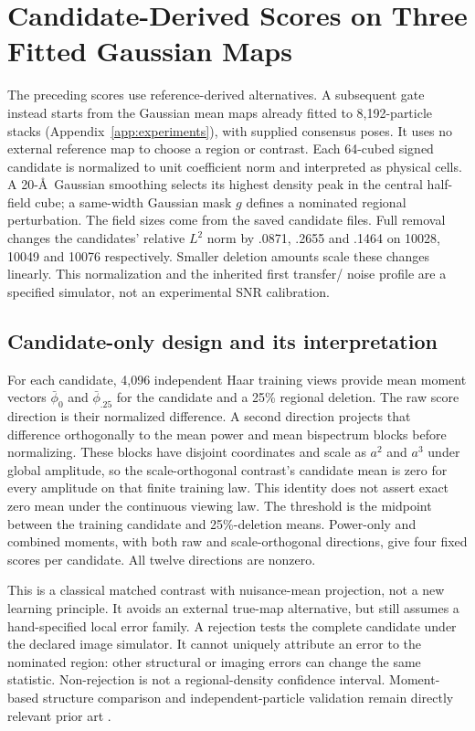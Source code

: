 \section{Candidate-Derived Scores on Three Fitted Gaussian Maps}
\label{app:candidatescore}
The preceding scores use reference-derived alternatives. A subsequent gate
instead starts from the Gaussian mean maps already fitted to 8,192-particle
stacks (Appendix~\ref{app:experiments}), with supplied consensus poses. It uses
no external reference map to choose a region or contrast. Each 64-cubed signed
candidate is normalized to unit coefficient norm and interpreted as physical
cells. A 20-\AA\ Gaussian smoothing selects its highest density peak in the
central half-field cube; a same-width Gaussian mask $g$ defines a nominated
regional perturbation. The field sizes come from the saved candidate files.
Full removal changes the candidates' relative $L^2$ norm by .0871, .2655 and
.1464 on 10028, 10049 and 10076 respectively. Smaller deletion amounts scale
these changes linearly. This normalization and the inherited first transfer/
noise profile are a specified simulator, not an experimental SNR calibration.

\subsection{Candidate-only design and its interpretation}
For each candidate, 4,096 independent Haar training views provide mean moment
vectors $\bar\phi_0$ and $\bar\phi_{.25}$ for the candidate and a 25\%
regional deletion. The raw score direction is their normalized difference.
A second direction projects that difference orthogonally to the mean power
and mean bispectrum blocks before normalizing. These blocks have disjoint
coordinates and scale as $a^2$ and $a^3$ under global amplitude, so the
scale-orthogonal contrast's candidate mean is zero for every amplitude on
that finite training law. This identity does not assert exact zero mean
under the continuous viewing law. The threshold is the midpoint between
the training candidate and 25\%-deletion means. Power-only and combined
moments, with both raw and scale-orthogonal directions, give four fixed
scores per candidate. All twelve directions are nonzero.

This is a classical matched contrast with nuisance-mean projection, not a
new learning principle. It avoids an external true-map alternative, but still
assumes a hand-specified local error family. A rejection tests the complete
candidate under the declared image simulator. It cannot uniquely attribute
an error to the nominated region: other structural or imaging errors can
change the same statistic. Non-rejection is not a regional-density confidence
interval. Moment-based structure comparison and independent-particle validation
remain directly relevant prior art \citep{momentmetrics2024,independent2020}.

